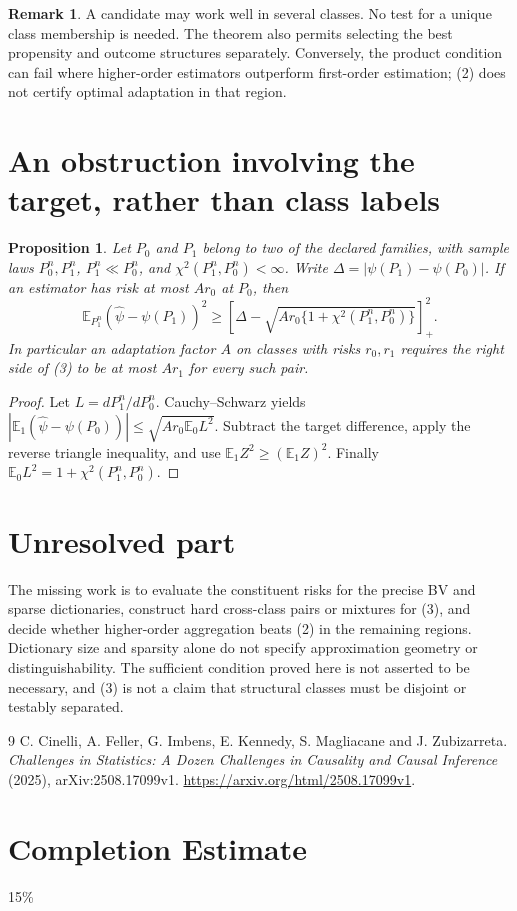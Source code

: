 \documentclass[11pt]{article}
\newtheorem{proposition}[theorem]{Proposition}
\theoremstyle{definition}
\newtheorem{remark}[theorem]{Remark}
\begin{document}
\begin{remark}
A candidate may work well in several classes. No test for a unique class
membership is needed. The theorem also permits selecting the best propensity
and outcome structures separately. Conversely, the product condition can
fail where higher-order estimators outperform first-order estimation;
(2) does not certify optimal adaptation in that region.
\end{remark}

\section*{An obstruction involving the target, rather than class labels}
\begin{proposition}
Let $P_0$ and $P_1$ belong to two of the declared families, with sample laws
$P_0^n,P_1^n$, $P_1^n\ll P_0^n$, and
$\chi^2(P_1^n,P_0^n)<\infty$. Write $\Delta=|\psi(P_1)-\psi(P_0)|$.
If an estimator has risk at most $A r_0$ at $P_0$, then
\[
 \mathbb E_{P_1^n}(\widehat\psi-\psi(P_1))^2
 \ge\left[\Delta-\sqrt{A r_0\{1+\chi^2(P_1^n,P_0^n)\}}\right]_+^2. \tag{3}
\]
In particular an adaptation factor $A$ on classes with risks $r_0,r_1$
requires the right side of (3) to be at most $A r_1$ for every such pair.
\end{proposition}
\begin{proof}
Let $L=dP_1^n/dP_0^n$. Cauchy--Schwarz yields
$|\mathbb E_1(\widehat\psi-\psi(P_0))|
\le\sqrt{A r_0\mathbb E_0L^2}$. Subtract the target difference,
apply the reverse triangle inequality, and use
$\mathbb E_1 Z^2\ge(\mathbb E_1Z)^2$. Finally
$\mathbb E_0L^2=1+\chi^2(P_1^n,P_0^n)$.
\end{proof}

\section*{Unresolved part}
The missing work is to evaluate the constituent risks for the precise BV and
sparse dictionaries, construct hard cross-class pairs or mixtures for (3),
and decide whether higher-order aggregation beats (2) in the remaining
regions. Dictionary size and sparsity alone do not specify approximation
geometry or distinguishability. The sufficient condition proved here is
not asserted to be necessary, and (3) is not a claim that structural classes
must be disjoint or testably separated.

\begin{thebibliography}{9}
 C. Cinelli, A. Feller, G. Imbens, E. Kennedy, S. Magliacane and J. Zubizarreta.
\emph{Challenges in Statistics: A Dozen Challenges in Causality and Causal Inference} (2025), arXiv:2508.17099v1.
\url{https://arxiv.org/html/2508.17099v1}.
\end{thebibliography}
\section{Completion Estimate}
15\%
\end{document}

